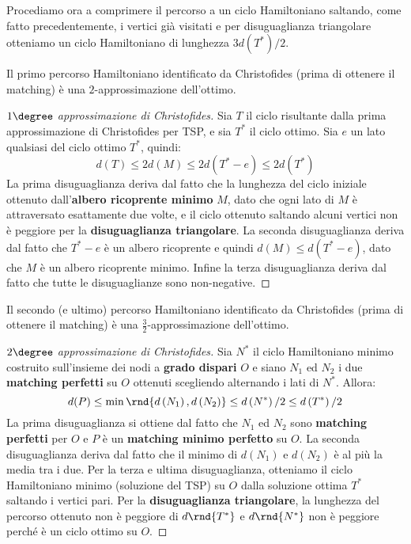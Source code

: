 \documentclass[\main/main.tex]{subfiles}
\begin{document}
\begin{multicols}{2}
\begin{definition}
    Procediamo ora a comprimere il percorso a un ciclo Hamiltoniano saltando, come fatto precedentemente, i vertici già visitati e per disuguaglianza triangolare otteniamo un ciclo Hamiltoniano di lunghezza \( 3 d\left(T^{*}\right) / 2\).
\end{definition}
\begin{lemma}
    Il primo percorso Hamiltoniano identificato da Christofides (prima di ottenere il matching) è una \(2\)-approssimazione dell'ottimo.
\end{lemma}
\begin{proof}[\(1\degree\) approssimazione di Christofides]
    Sia \(T\) il ciclo risultante dalla prima approssimazione di Christofides per TSP, e sia \(T^*\) il ciclo ottimo. Sia \(e\) un lato qualsiasi del ciclo ottimo \(T^*\), quindi:
    \[
        d(T) \leq 2 d(M) \leq 2 d\left(T^{*}-e\right) \leq 2 d\left(T^{*}\right)
    \]
    La prima disuguaglianza deriva dal fatto che la lunghezza del ciclo iniziale ottenuto dall'\textbf{albero ricoprente minimo} \(M\), dato che ogni lato di \(M\) è attraversato esattamente due volte, e il ciclo ottenuto saltando alcuni vertici non è peggiore per la \textbf{disuguaglianza triangolare}. La seconda disuguaglianza deriva dal fatto che \(T^{*}-e\) è un albero ricoprente e quindi \(d(M) \leq d\left(T^{*}-e\right)\), dato che \(M\) è un albero ricoprente minimo. Infine la terza disuguaglianza deriva dal fatto che tutte le disuguaglianze sono non-negative. 
\end{proof}
\begin{lemma}
    Il secondo (e ultimo) percorso Hamiltoniano identificato da Christofides (prima di ottenere il matching) è una \(\frac{3}{2}\)-approssimazione dell'ottimo.
\end{lemma}
\begin{proof}[\(2\degree\) approssimazione di Christofides]
    Sia \(N^*\) il ciclo Hamiltoniano minimo costruito sull'insieme dei nodi a \textbf{grado dispari} \(O\) e siano \(N_1\) ed \(N_2\) i due \textbf{matching perfetti} su \(O\) ottenuti scegliendo alternando i lati di \(N^*\). Allora:
    \[
        d(P) \leq \min \rnd{d\left(N_{1}\right), d\left(N_{2}\right)} \leq d\left(N^{*}\right) / 2 \leq d\left(T^{*}\right) / 2
    \]
    La prima disuguaglianza si ottiene dal fatto che \(N_1\) ed \(N_2\) sono \textbf{matching perfetti} per \(O\) e \(P\) è un \textbf{matching minimo perfetto} su \(O\). La seconda disuguaglianza deriva dal fatto che il minimo di \(d\left(N_{1}\right)\) e \(d\left(N_{2}\right)\) è al più la media tra i due. Per la terza e ultima disuguaglianza, otteniamo il ciclo Hamiltoniano minimo (soluzione del TSP) su \(O\) dalla soluzione ottima \(T^*\) saltando i vertici pari. Per la \textbf{disuguaglianza triangolare}, la lunghezza del percorso ottenuto non è peggiore di \(d\rnd{T^*}\) e \(d\rnd{N^*}\) non è peggiore perché è un ciclo ottimo su \(O\).
    

\end{proof}
\end{multicols}
\end{document}
